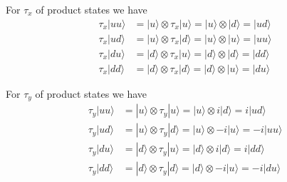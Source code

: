 \documentclass[12pt]{article}
\begin{document}
For $\tau_x$ of product states we have
\begin{align*}
\tau_x|uu\rangle&=|u\rangle\otimes\tau_x|u\rangle
=|u\rangle\otimes|d\rangle=|ud\rangle
\\[1ex]
\tau_x|ud\rangle&=|u\rangle\otimes\tau_x|d\rangle
=|u\rangle\otimes|u\rangle=|uu\rangle
\\[1ex]
\tau_x|du\rangle&=|d\rangle\otimes\tau_x|u\rangle
=|d\rangle\otimes|d\rangle=|dd\rangle
\\[1ex]
\tau_x|dd\rangle&=|d\rangle\otimes\tau_x|d\rangle
=|d\rangle\otimes|u\rangle=|du\rangle
\end{align*}

For $\tau_y$ of product states we have
\begin{align*}
\tau_y|uu\rangle&=|u\rangle\otimes\tau_y|u\rangle
=|u\rangle\otimes i|d\rangle=i|ud\rangle
\\[1ex]
\tau_y|ud\rangle&=|u\rangle\otimes\tau_y|d\rangle
=|u\rangle\otimes-i|u\rangle=-i|uu\rangle
\\[1ex]
\tau_y|du\rangle&=|d\rangle\otimes\tau_y|u\rangle
=|d\rangle\otimes i|d\rangle=i|dd\rangle
\\[1ex]
\tau_y|dd\rangle&=|d\rangle\otimes\tau_y|d\rangle
=|d\rangle\otimes-i|u\rangle=-i|du\rangle
\end{align*}
\end{document}
